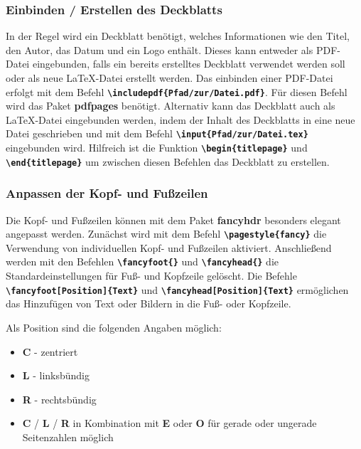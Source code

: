 \subsubsection{Einbinden / Erstellen des Deckblatts}
In der Regel wird ein Deckblatt benötigt, welches Informationen wie den Titel, den Autor, das Datum und ein Logo enthält. Dieses kann entweder als PDF-Datei eingebunden, falls ein bereits erstelltes Deckblatt verwendet werden soll oder als neue LaTeX-Datei erstellt werden.
Das einbinden einer PDF-Datei erfolgt mit dem Befehl \textbf{\texttt{\textbackslash includepdf\{Pfad/zur/Datei.pdf\}}}. Für diesen Befehl wird das Paket \textbf{pdfpages} benötigt.
Alternativ kann das Deckblatt auch als LaTeX-Datei eingebunden werden, indem der Inhalt des Deckblatts in eine neue Datei geschrieben und mit dem Befehl \textbf{\texttt{\textbackslash input\{Pfad/zur/Datei.tex\}}} eingebunden wird. Hilfreich ist die Funktion \textbf{\texttt{\textbackslash begin\{titlepage\}}} und \textbf{\texttt{\textbackslash end\{titlepage\}}} um zwischen diesen Befehlen das Deckblatt zu erstellen.

\subsubsection{Anpassen der Kopf- und Fußzeilen}
Die Kopf- und Fußzeilen können mit dem Paket \textbf{fancyhdr} besonders elegant angepasst werden. Zunächst wird mit dem Befehl \textbf{\texttt{\textbackslash pagestyle\{fancy\}}} die Verwendung von individuellen Kopf- und Fußzeilen aktiviert. Anschließend werden mit den Befehlen \textbf{\texttt{\textbackslash fancyfoot\{\}}} und \textbf{\texttt{\textbackslash fancyhead\{\}}} die Standardeinstellungen für Fuß- und Kopfzeile gelöscht. Die Befehle \textbf{\texttt{\textbackslash fancyfoot[Position]\{Text\}}} und \textbf{\texttt{\textbackslash fancyhead[Position]\{Text\}}} ermöglichen das Hinzufügen von Text oder Bildern in die Fuß- oder Kopfzeile.

Als Position sind die folgenden Angaben möglich:
\begin{itemize}
    \item \textbf{C} - zentriert
    \item \textbf{L} - linksbündig
    \item \textbf{R} - rechtsbündig
    \item \textbf{C} / \textbf{L} / \textbf{R} in Kombination mit \textbf{E} oder \textbf{O} für gerade oder ungerade Seitenzahlen möglich
\end{itemize}

